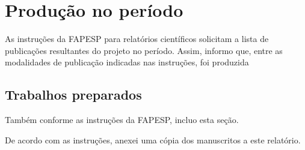 \section{Produção no período} %
As instruções da FAPESP para relatórios científicos solicitam a lista de publicações resultantes do projeto no período.
Assim, informo que, entre as modalidades de publicação indicadas nas instruções, foi produzida 


\subsection{Trabalhos preparados} %
Também conforme as instruções da FAPESP, incluo esta seção. 


De acordo com as instruções, anexei uma cópia dos manuscritos a este relatório.
